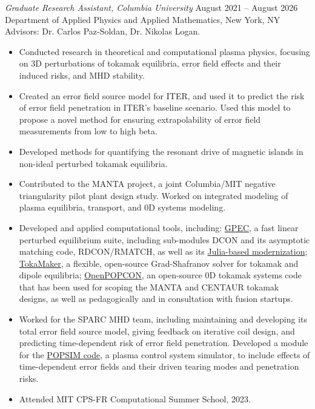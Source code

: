 \documentclass{rpires}
\begin{document}
\begin{resume}
\textit{Graduate Research Assistant, Columbia University} \hfill August 2021 -- August 2026 \\
Department of Applied Physics and Applied Mathematics, New York, NY \\
Advisors: Dr. Carlos Paz-Soldan, Dr. Nikolas Logan.
\begin{itemize}
  \item {Conducted research in theoretical and computational plasma physics, focusing on 3D perturbations of tokamak equilibria, error field effects and their induced risks, and MHD stability.}
  \item {Created an error field source model for ITER, and used it to predict the risk of error field penetration in ITER's baseline scenario. Used this model to propose a novel method for ensuring extrapolability of error field measurements from low to high beta.}
  \item {Developed methods for quantifying the resonant drive of magnetic islands in non-ideal perturbed tokamak equilibria.}
  \item {Contributed to the MANTA project, a joint Columbia/MIT negative triangularity pilot plant design study. Worked on integrated modeling of plasma equilibria, transport, and 0D systems modeling.}
  \item {Developed and applied computational tools, including: \href{https://github.com/PrincetonUniversity/GPEC}{GPEC}, a fast linear perturbed equilibrium suite, including sub-modules DCON and its asymptotic matching code, RDCON/RMATCH, as well as its \href{https://github.com/OpenFUSIONToolkit/GPEC}{Julia-based modernization}; \href{https://github.com/OpenFUSIONToolkit/OpenFUSIONToolkit}{TokaMaker}, a flexible, open-source Grad-Shafranov solver for tokamak and dipole equilibria; \href{https://github.com/hansec/OpenPOPCON}{OpenPOPCON}, an open-source 0D tokamak systems code that has been used for scoping the MANTA and CENTAUR tokamak designs, as well as pedagogically and in consultation with fusion startups.} %
  \item {Worked for the SPARC MHD team, including maintaining and developing its total error field source model, giving feedback on iterative coil design, and predicting time-dependent risk of error field penetration. Developed a module for the \href{https://arxiv.org/abs/2509.10244}{POPSIM code}, a plasma control system simulator, to include effects of time-dependent error fields and their driven tearing modes and penetration risks.}
  \item {Attended MIT CPS-FR Computational Summer School, 2023.}
\end{itemize}


\end{resume}
\end{document}
